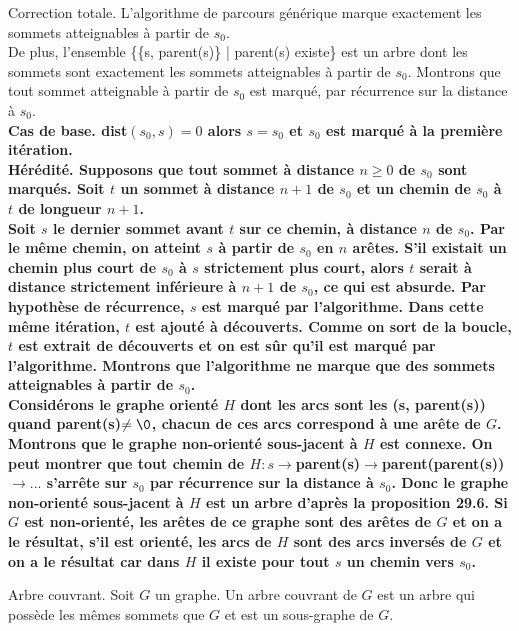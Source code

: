 \documentclass[french, 11pt]{article}
\begin{document}
\begin{prop}{Correction totale.}{}
    L'algorithme de parcours générique marque exactement les sommets atteignables à partir de $s_0$.\\
    De plus, l'ensemble \{\{s, parent(s)\} | parent(s) existe\} est un arbre dont les sommets sont exactement les sommets atteignables à partir de $s_0$.
    \tcblower
     Montrons que tout sommet atteignable à partir de $s_0$ est marqué, par récurrence sur la distance à $s_0$.\\
    \bf{Cas de base.} dist$(s_0,s)=0$ alors $s=s_0$ et $s_0$ est marqué à la première itération.\\
    \bf{Hérédité.} Supposons que tout sommet à distance $n\geq0$ de $s_0$ sont marqués. Soit $t$ un sommet à distance $n+1$ de $s_0$ et un chemin de $s_0$ à $t$ de longueur $n+1$.\\
    Soit $s$ le dernier sommet avant $t$ sur ce chemin, à distance $n$ de $s_0$. Par le même chemin, on atteint $s$ à partir de $s_0$ en $n$ arêtes. S'il existait un chemin plus court de $s_0$ à $s$ strictement plus court, alors $t$ serait à distance strictement inférieure à $n+1$ de $s_0$, ce qui est absurde. Par hypothèse de récurrence, $s$ est marqué par l'algorithme. Dans cette même itération, $t$ est ajouté à découverts. Comme on sort de la boucle, $t$ est extrait de découverts et on est sûr qu'il est marqué par l'algorithme.\n
     Montrons que l'algorithme ne marque que des sommets atteignables à partir de $s_0$.\\
    Considérons le graphe orienté $H$ dont les arcs sont les (s, parent(s)) quand parent(s)$\neq\0$, chacun de ces arcs correspond à une arête de $G$. Montrons que le graphe non-orienté sous-jacent à $H$ est connexe. On peut montrer que tout chemin de $H:s\to$parent(s)$\to$parent(parent(s))$\to...$ s'arrête sur $s_0$ par récurrence sur la distance à $s_0$. Donc le graphe non-orienté sous-jacent à $H$ est un arbre d'après la proposition 29.6. Si $G$ est non-orienté, les arêtes de ce graphe sont des arêtes de $G$ et on a le résultat, s'il est orienté, les arcs de $H$ sont des arcs inversés de $G$ et on a le résultat car dans $H$ il existe pour tout $s$ un chemin vers $s_0$.
\end{prop}

\begin{defi}{Arbre couvrant.}{}
    Soit $G$ un graphe. Un arbre couvrant de $G$ est un arbre qui possède les mêmes sommets que $G$ et est un sous-graphe de $G$.
\end{defi}
\end{document}
